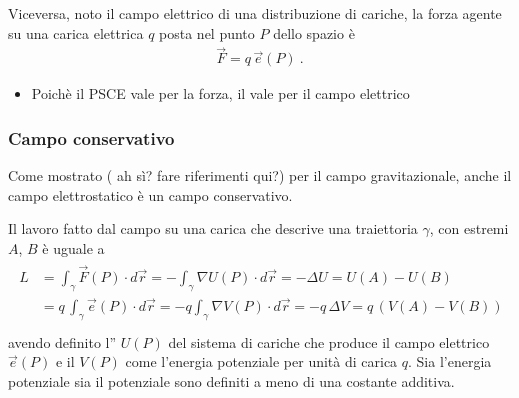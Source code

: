\documentclass[letterpaper,10pt,italian]{jupyterBook}
\begin{document}
\sphinxAtStartPar
Viceversa, noto il campo elettrico di una distribuzione di cariche, la forza agente su una carica elettrica \(q\) posta nel punto \(P\) dello spazio è
\begin{equation*}
\begin{split}\vec{F} = q \, \vec{e}(P) \ .\end{split}
\end{equation*}\begin{itemize}
\item {} 
\sphinxAtStartPar
{} Poichè il PSCE vale per la forza, il  vale per il campo elettrico

\end{itemize}


\subsubsection{Campo conservativo}
\label{\detokenize{ch/electromagnetism/electrostatics:campo-conservativo}}\label{\detokenize{ch/electromagnetism/electrostatics:physics-hs-electromagnetism-electrostatics-e-field-conservative}}
\sphinxAtStartPar
Come mostrato (  ah sì? fare riferimenti qui?) per il campo gravitazionale, anche il campo elettrostatico è un campo conservativo.

\sphinxAtStartPar
Il lavoro fatto dal campo su una carica che descrive una traiettoria \(\gamma\), con estremi \(A\), \(B\) è uguale a
\begin{equation*}
\begin{split}\begin{aligned}
  L & = \int_{\gamma} \vec{F}(P) \cdot d \vec{r} = - \int_{\gamma} \nabla U(P) \cdot d \vec{r} = - \Delta U = U(A) - U(B) \\
    & = q \, \int_{\gamma} \vec{e}(P) \cdot d \vec{r} = - q \int_{\gamma} \nabla V(P) \cdot d \vec{r} = - q \, \Delta V = q \, \left( V(A) - V(B) \right) \\
\end{aligned}\end{split}
\end{equation*}
\sphinxAtStartPar
avendo definito l” \(U(P)\) del sistema di cariche che produce il campo elettrico \(\vec{e}(P)\) e il  \(V(P)\) come l’energia potenziale per unità di carica \(q\). Sia l’energia potenziale sia il potenziale sono definiti a meno di una costante additiva.
\end{document}
